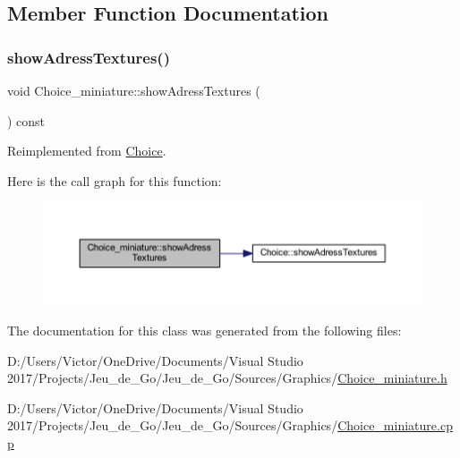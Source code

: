 \subsection{Member Function Documentation}
\mbox{\label{class_choice__miniature_a6f413024d98b0c334c5a3e6ec87eba9b}} 
\subsubsection{\texorpdfstring{show\+Adress\+Textures()}{showAdressTextures()}}
{\footnotesize\ttfamily void Choice\+\_\+miniature\+::show\+Adress\+Textures (\begin{DoxyParamCaption}{ }\end{DoxyParamCaption}) const\hspace{0.3cm}{\ttfamily [virtual]}}



Reimplemented from \hyperlink{class_choice_ad29163ceee43a59dba6ea46452ca46c0}{Choice}.

Here is the call graph for this function\+:
\nopagebreak
\begin{figure}[H]
\begin{center}
\leavevmode
\includegraphics[width=350pt]{class_choice__miniature_a6f413024d98b0c334c5a3e6ec87eba9b_cgraph}
\end{center}
\end{figure}


The documentation for this class was generated from the following files\+:\begin{DoxyCompactItemize}
\item 
D\+:/\+Users/\+Victor/\+One\+Drive/\+Documents/\+Visual Studio 2017/\+Projects/\+Jeu\+\_\+de\+\_\+\+Go/\+Jeu\+\_\+de\+\_\+\+Go/\+Sources/\+Graphics/\hyperlink{_choice__miniature_8h}{Choice\+\_\+miniature.\+h}\item 
D\+:/\+Users/\+Victor/\+One\+Drive/\+Documents/\+Visual Studio 2017/\+Projects/\+Jeu\+\_\+de\+\_\+\+Go/\+Jeu\+\_\+de\+\_\+\+Go/\+Sources/\+Graphics/\hyperlink{_choice__miniature_8cpp}{Choice\+\_\+miniature.\+cpp}\end{DoxyCompactItemize}
